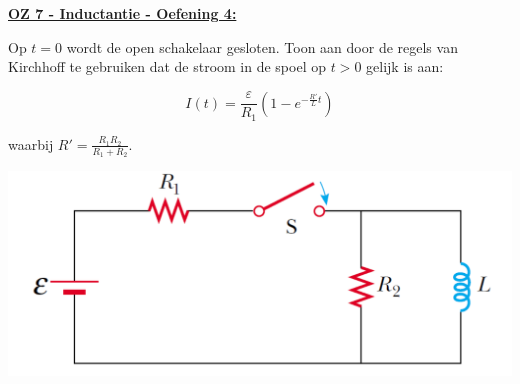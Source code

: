 \textbf{\underline{OZ 7 - Inductantie - Oefening 4:}}
\vspace{0.5cm}

Op $t = 0$ wordt de open schakelaar gesloten. Toon aan door de regels van Kirchhoff te gebruiken dat de stroom in de spoel op $t > 0$ gelijk is aan:

\begin{equation*}
    I(t) = \frac{\varepsilon}{R_1} \left( 1 - e^{-\tfrac{R'}{L}t} \right)
\end{equation*}

waarbij $R' = \frac{R_1R_2}{R_1 + R_2}$.

\begin{center}
    \includegraphics[scale = 0.3]{oz07/resources/Oz7Oef4.png}
\end{center}


\begin{description}[labelwidth=1.5cm, leftmargin=!]
    \item[Geg. :] 
    \item[Gevr. :] 
    \item[Opl. :]
\end{description}


\vspace{1cm}